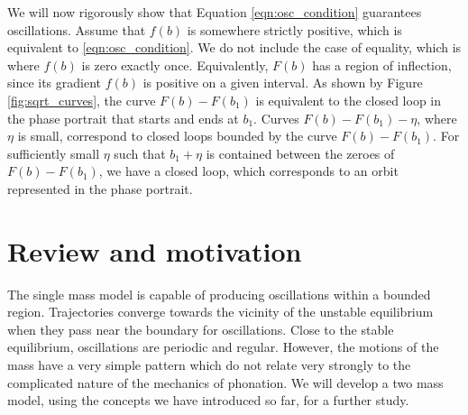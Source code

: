 We will now rigorously show that Equation \ref{eqn:osc_condition} guarantees oscillations.
Assume that $f(b)$ is somewhere strictly positive, which is equivalent to \ref{eqn:osc_condition}.
We do not include the case of equality,
which is where $f(b)$ is zero exactly once.
Equivalently, $F(b)$ has a region of inflection,
since its gradient $f(b)$ is positive on a given interval.
As shown by Figure \ref{fig:sqrt_curves},
the curve $F(b)-F(b_1)$ is equivalent to the closed loop in the phase portrait that starts and ends at $b_1$.
Curves $F(b)-F(b_1)-\eta$, where $\eta$ is small,
correspond to closed loops bounded by the curve $F(b)-F(b_1)$.
For sufficiently small $\eta$ such that $b_1+\eta$ is contained between the zeroes of $F(b)-F(b_1)$,
we have a closed loop, which corresponds to an orbit represented in the phase portrait.

\section{Review and motivation}

The single mass model is capable of producing oscillations within a bounded region.
Trajectories converge towards the vicinity of the unstable equilibrium when they pass near the boundary for oscillations.
Close to the stable equilibrium, oscillations are periodic and regular.
However, the motions of the mass have a very simple pattern which do not relate very strongly to the complicated nature of the mechanics of phonation.
We will develop a two mass model, using the concepts we have introduced so far, for a further study.








%
%

%